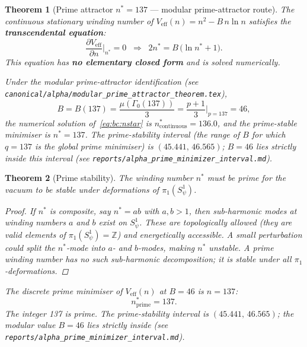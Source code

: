 \documentclass[12pt,a4paper]{article}
\newtheorem{theorem}{Theorem}[section]
\theoremstyle{definition}
\theoremstyle{remark}
\begin{document}
\begin{theorem}[Prime attractor $n^* = 137$ — modular prime-attractor route]
\label{thm:bc:nstar}
The continuous stationary winding number of $V_{\mathrm{eff}}(n) = n^2 - B\,n\ln n$
satisfies the \textbf{transcendental equation}:
\begin{equation}
  \frac{\partial V_{\mathrm{eff}}}{\partial n}\bigg|_{n^*} = 0
  \;\;\Longrightarrow\;\;
  \boxed{2n^* = B\,\bigl(\ln n^* + 1\bigr).}
  \label{eq:bc:nstar}
\end{equation}
This equation has \textbf{no elementary closed form} and is solved numerically.

Under the modular prime-attractor identification (see
\texttt{canonical/alpha/modular\_prime\_attractor\_theorem.tex}),
\begin{equation}
  B = B(137) = \frac{\mu(\Gamma_0(137))}{3} = \frac{p+1}{3}\bigg|_{p=137} = 46,
  \label{eq:bc:B_modular}
\end{equation}
the numerical solution of~\eqref{eq:bc:nstar} is $n^*_{\mathrm{continuous}} = 136.0$,
and the prime-stable minimiser is $n^* = 137$.  The prime-stability interval
(the range of $B$ for which $q = 137$ is the global prime minimiser) is
$(45.441,\,46.565)$; $B = 46$ lies strictly inside this interval
(see \texttt{reports/alpha\_prime\_minimizer\_interval.md}).
\end{theorem}

\begin{theorem}[Prime stability]
\label{thm:bc:prime_stability}
The winding number $n^*$ must be prime for the vacuum to be stable under
deformations of $\pi_1(S^1_\psi)$.

\begin{proof}
If $n^*$ is composite, say $n^* = ab$ with $a, b > 1$, then sub-harmonic modes
at winding numbers $a$ and $b$ exist on $S^1_\psi$.  These are topologically allowed
(they are valid elements of $\pi_1(S^1_\psi) = \mathbb{Z}$) and energetically
accessible.  A small perturbation could split the $n^*$-mode into $a$- and $b$-modes,
making $n^*$ unstable.  A prime winding number has no such sub-harmonic decomposition;
it is stable under all $\pi_1$-deformations.
\end{proof}

The discrete prime minimiser of $V_{\mathrm{eff}}(n)$ at $B = 46$ is $n = 137$:
\begin{equation}
  n^*_{\mathrm{prime}} = 137.
  \label{eq:bc:nstar_137}
\end{equation}
The integer 137 is prime.  The prime-stability interval is $(45.441,\,46.565)$;
the modular value $B = 46$ lies strictly inside (see
\texttt{reports/alpha\_prime\_minimizer\_interval.md}).
\end{theorem}
\end{document}
